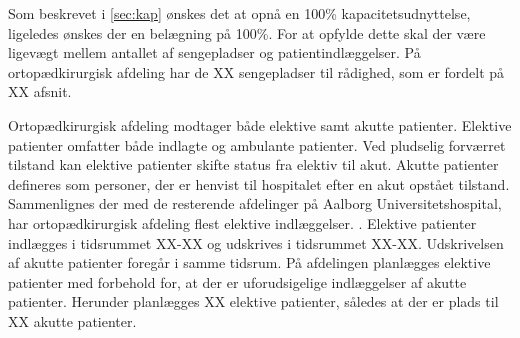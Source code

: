 Som beskrevet i \autoref{sec:kap} ønskes det at opnå en 100\% kapacitetsudnyttelse, ligeledes ønskes der en belægning på 100\%. 
For at opfylde dette skal der være ligevægt mellem antallet af sengepladser og patientindlæggelser. På ortopædkirurgisk afdeling har de XX sengepladser til rådighed, som er fordelt på XX afsnit.

Ortopædkirurgisk afdeling modtager både elektive samt akutte patienter. Elektive patienter omfatter både indlagte og ambulante patienter. Ved pludselig forværret tilstand kan elektive patienter skifte status fra elektiv til akut. Akutte patienter defineres som personer, der er henvist til hospitalet efter en akut opstået tilstand. Sammenlignes der med de resterende afdelinger på Aalborg Universitetshospital, har ortopædkirurgisk afdeling flest elektive indlæggelser. \cite{RegionNord2016}. Elektive patienter indlægges i tidsrummet XX-XX og udskrives i tidsrummet XX-XX. Udskrivelsen af akutte patienter foregår i samme tidsrum. På afdelingen planlægges elektive patienter med forbehold for, at der er uforudsigelige indlæggelser af akutte patienter. Herunder planlægges XX elektive patienter, således at der er plads til XX akutte patienter.